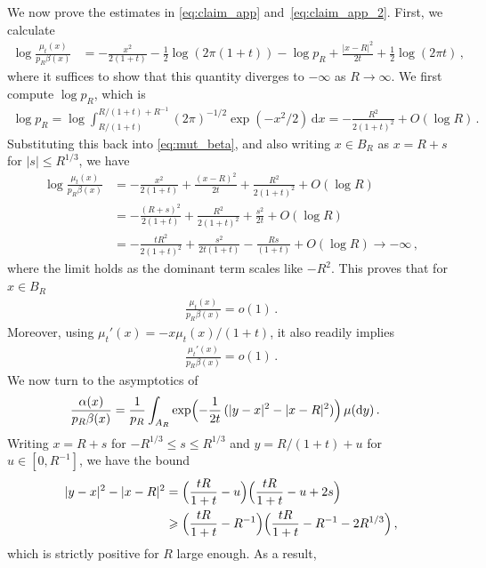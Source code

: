 \documentclass[12pt]{article}
\newcommand{\1}{\mathds{1}}
\newcommand*{\rd}{\mathrm{d}}
\newcommand*{\dd}{\, \rd}
\renewcommand{\geq}{\geqslant}
\renewcommand{\leq}{\leqslant}
\theoremstyle{plain}
\theoremstyle{definition}
\theoremstyle{remark}
\begin{document}
We now prove the estimates in \eqref{eq:claim_app} and~\eqref{eq:claim_app_2}.
First, we calculate
\begin{align}\label{eq:mut_beta}
    \log\frac{\mu_t(x)}{p_R \beta(x)}
    &= -\frac{x^2}{2(1+t)} -\frac{1}{2} \log(2\pi(1+t)) -\log p_R + \frac{|x-R|^2}{2t} + \frac{1}{2} \log(2\pi t)\,,
\end{align}
where it suffices to show that this quantity diverges to $-\infty$ as $R\to\infty$. We first compute $\log p_R$, which is
\begin{align*}
    \log p_R = \log \int_{R/(1+t)}^{R/(1+t) + R^{-1}} (2\pi)^{-1/2}\exp(-x^2/2)\dd x
    = -\frac{R^2}{2(1+t)^2} + O(\log R)\,.
\end{align*}
Substituting this back into \eqref{eq:mut_beta}, and also writing $x \in B_R$ as $x = R + s$ for $|s|\leq R^{1/3}$, we have
\begin{align*}
    \log\frac{\mu_t(x)}{p_R \beta(x)} &= -\frac{x^2}{2(1+t)} + \frac{(x-R)^2}{2t} + \frac{R^2}{2(1+t)^2} + O(\log R) \\
    &= -\frac{(R+s)^2}{2(1+t)} +\frac{R^2}{2(1+t)^2} + \frac{s^2}{2t} + O(\log R) \\
    &= {-\frac{tR^2}{2(1+t)^2} + \frac{s^2}{2t(1+t)} - \frac{Rs}{(1+t)} + O(\log R) \rightarrow -\infty}\,,
\end{align*}
where the limit holds as the dominant term scales like $-R^2$. This proves that for $x \in B_R$
\begin{align*}
\frac{\mu_t(x)}{p_R \beta(x)} = o(1)\,.
\end{align*}
{Moreover, using $\mu_t'(x) = -x\mu_t(x)/(1+t)$, it also readily implies
\begin{align*}
    \frac{\mu_t'(x)}{p_R\beta(x)} = o(1)\,.
\end{align*}
}
We now turn to the asymptotics of
\begin{align*}
    \frac{\alpha(x)}{p_R \beta(x)}
    &= \frac{1}{p_R} \int_{A_R} \exp\Bigl(-\frac{1}{2t}\,(|y-x|^2 - |x-R|^2)\Bigr) \,\mu(\!\dd y)\,.
\end{align*}
Writing $x = R+s$ for $-R^{1/3} \leq s \leq R^{1/3}$ and $y = R/(1+t) + u$ for $u \in [0,R^{-1}]$, we have the bound
\begin{align*}
    |y-x|^2 - |x-R|^2 &= \Bigl(\frac{tR}{1+t} - u\Bigr)\Bigl(\frac{tR}{1+t} - u + 2s\Bigr) \\
    &\geq \Bigl(\frac{tR}{1+t} - R^{-1}\Bigr)\Bigl(\frac{tR}{1+t} - R^{-1} - 2R^{1/3}\Bigr)\,,
\end{align*}
which is strictly positive for $R$ large enough. As a result, 
\end{document}
